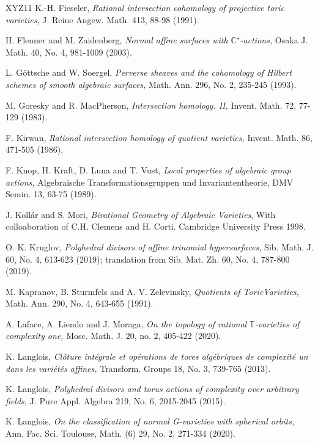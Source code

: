 \documentclass[11pt, reqno]{amsart}
\theoremstyle{plain}
\theoremstyle{definition}
\theoremstyle{remark}
\begin{document}
\begin{thebibliography}{XYZ11}
 K.-H. Fieseler, \emph{Rational intersection cohomology of projective toric varieties,} J. Reine Angew. Math.
413, 88-98 (1991). 

H. Flenner and M. Zaidenberg,  \emph{Normal affine surfaces with $\mathbb{C}^{\star}$-actions,} Osaka J. Math.
40, No. 4, 981-1009 (2003). 



 L. G\" ottsche and W. Soergel, \emph{Perverse sheaves and the cohomology of Hilbert schemes of smooth algebraic surfaces,}  Math. Ann. 296, No. 2, 235-245 (1993). 



M. Goresky and R. MacPherson, \emph{Intersection homology. II,} Invent. Math. 72, 77-129 (1983). 


 F. Kirwan, \emph{Rational intersection homology of quotient varieties,} Invent. Math. 86, 471-505 (1986).  

  F. Knop, H. Kraft, D. Luna and T. Vust,  \emph{Local properties of algebraic group actions,} Algebraische Transformationsgruppen und Invariantentheorie, DMV Semin. 13, 63-75 (1989). 

 J. Koll\'ar and S. Mori, \emph{Birational Geometry of Algebraic Varieties}, With colloaboration of C.H. Clemens and H. Corti. Cambridge University Press 1998.

 O. K. Kruglov,  \emph{Polyhedral divisors of affine trinomial hypersurfaces,} Sib. Math. J. 60, No. 4, 613-623 (2019); translation from Sib. Mat. Zh. 60, No. 4, 787-800 (2019). 

 M. Kapranov, B. Sturmfels and A. V. Zelevinsky, \emph{Quotients of ToricVarieties,} Math. Ann. 290, No. 4, 643-655 (1991). 

 A. Laface, A. Liendo and J. Moraga, \emph{On the topology of rational $\mathbb {T}$-varieties of complexity one,}
Mosc. Math. J. 20, no. 2, 405-422  (2020).

 K. Langlois, \emph{Cl\^oture int\'egrale et op\'erations de tores alg\'ebriques de complexit\'e un dans les vari\'et\'es affines,}  Transform. Groups 18, No. 3, 739-765 (2013). 

 K. Langlois, \emph{Polyhedral divisors and torus actions of complexity over arbitrary fields,} J. Pure Appl. Algebra 219, No. 6, 2015-2045 (2015).

 K. Langlois, \emph{On the classification of normal G-varieties with spherical orbits,} Ann. Fac. Sci. Toulouse, Math. (6) 29, No. 2, 271-334 (2020). 


\end{thebibliography}
\end{document}
